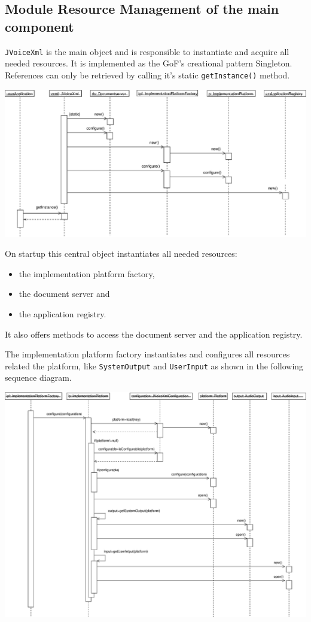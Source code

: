 \documentclass[11pt,a4paper]{article}
\begin{document}
\subsection{Module Resource Management of the main component}

\texttt{JVoiceXml} is the main object and is responsible to instantiate and
acquire all needed resources. It is implemented as the GoF's creational
pattern Singleton\cite{gamma:design_patterns}. References
can only be retrieved by calling it's static \texttt{getInstance()} method.

\begin{center}
\includegraphics[scale=0.4]{seq-jvoicexml-startup.eps}
\end{center}

On startup this central object instantiates all needed resources:

\begin{itemize}
\item the implementation platform factory,
\item the document server and
\item the application registry.
\end{itemize}

It also offers methods to access the document server and the application
registry.

The implementation platform factory instantiates and configures all
resources related the platform, like \texttt{SystemOutput} and
\texttt{UserInput} as shown in the following sequence diagram.

\begin{center}
\includegraphics[scale=0.35]{seq-implementation.eps}
\end{center}
\end{document}
